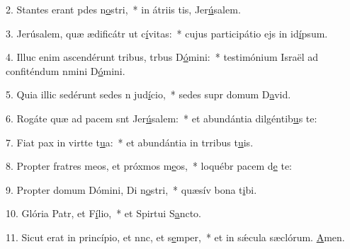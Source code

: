 2. Stantes erant pdes n\uline{o}stri,~* in átriis tis, Jer\uline{ú}salem.\par 
3. Jerúsalem, quæ ædificátr ut c\uline{í}vitas:~* cujus participátio ejs in id\uline{í}psum.\par 
4. Illuc enim ascendérunt tribus, trbus D\uline{ó}mini:~* testimónium Israël ad confiténdum nmini D\uline{ó}mini.\par 
5. Quia illic sedérunt sedes n jud\uline{í}cio,~* sedes supr domum D\uline{a}vid.\par 
6. Rogáte quæ ad pacem snt Jer\uline{ú}salem:~* et abundántia dilgéntib\uline{u}s te:\par 
7. Fiat pax in virtte t\uline{u}a:~* et abundántia in trribus t\uline{u}is.\par 
8. Propter fratres meos, et próxmos m\uline{e}os,~* loquébr pacem d\uline{e} te:\par 
9. Propter domum Dómini, Di n\uline{o}stri,~* quæsív bona t\uline{i}bi.\par 
10. Glória Patr, et F\uline{í}lio,~* et Spirtui S\uline{a}ncto.\par 
11. Sicut erat in princípio, et nnc, et s\uline{e}mper,~* et in sǽcula sæclórum. \uline{A}men.\par 
